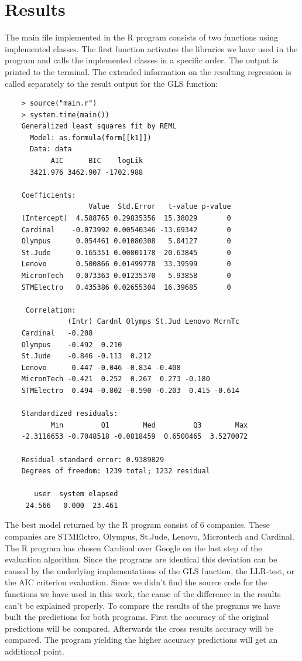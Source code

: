 \documentclass[
  twoside,
  11pt, a4paper,
  footinclude=true,
  headinclude=true,
  cleardoublepage=empty
]{scrreprt}
\begin{document}
    \section{Results}
    The main file implemented in the R program consists of two functions using implemented classes. The first function activates the libraries we have used in the program and calls the implemented classes in a specific order. The output is printed to the terminal. The extended information on the resulting regression is called separately to the result output for the GLS function:
    \begin{verbatim}
    > source("main.r")
    > system.time(main())
    Generalized least squares fit by REML
      Model: as.formula(form[[k1]]) 
      Data: data 
           AIC      BIC    logLik
      3421.976 3462.907 -1702.988
    
    Coefficients:
                    Value  Std.Error   t-value p-value
    (Intercept)  4.588765 0.29835356  15.38029       0
    Cardinal    -0.073992 0.00540346 -13.69342       0
    Olympus      0.054461 0.01080308   5.04127       0
    St.Jude      0.165351 0.00801178  20.63845       0
    Lenovo       0.500866 0.01499778  33.39599       0
    MicronTech   0.073363 0.01235370   5.93858       0
    STMElectro   0.435386 0.02655304  16.39685       0
    
     Correlation: 
               (Intr) Cardnl Olymps St.Jud Lenovo McrnTc
    Cardinal   -0.208                                   
    Olympus    -0.492  0.210                            
    St.Jude    -0.846 -0.113  0.212                     
    Lenovo      0.447 -0.046 -0.834 -0.408              
    MicronTech -0.421  0.252  0.267  0.273 -0.180       
    STMElectro  0.494 -0.802 -0.590 -0.203  0.415 -0.614
    
    Standardized residuals:
           Min         Q1        Med         Q3        Max 
    -2.3116653 -0.7048518 -0.0818459  0.6500465  3.5270072 
    
    Residual standard error: 0.9389829 
    Degrees of freedom: 1239 total; 1232 residual
    
       user  system elapsed 
     24.566   0.000  23.461 
    \end{verbatim}    
    The best model returned by the R program consist of 6 companies. These companies are STMElctro, Olympus, St.Jude, Lenovo, Microntech and Cardinal. The R program has chosen Cardinal over Google on the last step of the evaluation algorithm. Since the programs are identical this deviation can be caused by the underlying implementations of the GLS function, the LLR-test, or the AIC criterion evaluation. Since we didn't find the source code for the functions we have used in this work, the cause of the difference in the results can't be explained properly. To compare the results of the programs we have built the predictions for both programs. First the accuracy of the original predictions will be compared. Afterwards the cross results accuracy will be compared. The program yielding the higher accuracy predictions will get an additional point.\\
\end{document}
